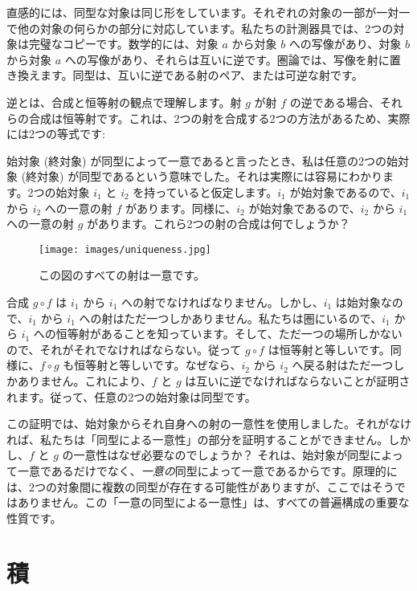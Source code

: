 直感的には、同型な対象は同じ形をしています。それぞれの対象の一部が一対一で他の対象の何らかの部分に対応しています。私たちの計測器具では、2つの対象は完璧なコピーです。数学的には、対象 $a$ から対象 $b$ への写像があり、対象 $b$ から対象 $a$ への写像があり、それらは互いに逆です。圏論では、写像を射に置き換えます。同型は、互いに逆である射のペア、または可逆な射です。

逆とは、合成と恒等射の観点で理解します。射 $g$ が射 $f$ の逆である場合、それらの合成は恒等射です。これは、2つの射を合成する2つの方法があるため、実際には2つの等式です: 

始対象 (終対象) が同型によって一意であると言ったとき、私は任意の2つの始対象 (終対象) が同型であるという意味でした。それは実際には容易にわかります。2つの始対象 $i_{1}$ と $i_{2}$ を持っていると仮定します。$i_{1}$ が始対象であるので、$i_{1}$ から $i_{2}$ への一意の射 $f$ があります。同様に、$i_{2}$ が始対象であるので、$i_{2}$ から $i_{1}$ への一意の射 $g$ があります。これら2つの射の合成は何でしょうか？

\begin{figure}[H]
  \centering
  \texttt{[image: images/uniqueness.jpg]}
  \caption{この図のすべての射は一意です。}
\end{figure}

\noindent
合成 $g \circ f$ は $i_{1}$ から $i_{1}$ への射でなければなりません。しかし、$i_{1}$ は始対象なので、$i_{1}$ から $i_{1}$ への射はただ一つしかありません。私たちは圏にいるので、$i_{1}$ から $i_{1}$ への恒等射があることを知っています。そして、ただ一つの場所しかないので、それがそれでなければならない。従って $g \circ f$ は恒等射と等しいです。同様に、$f \circ g$ も恒等射と等しいです。なぜなら、$i_{2}$ から $i_{2}$ へ戻る射はただ一つしかありません。これにより、$f$ と $g$ は互いに逆でなければならないことが証明されます。従って、任意の2つの始対象は同型です。

この証明では、始対象からそれ自身への射の一意性を使用しました。それがなければ、私たちは「同型による一意性」の部分を証明することができません。しかし、$f$ と $g$ の一意性はなぜ必要なのでしょうか？ それは、始対象が同型によって一意であるだけでなく、\emph{一意の}同型によって一意であるからです。原理的には、2つの対象間に複数の同型が存在する可能性がありますが、ここではそうではありません。この「一意の同型による一意性」は、すべての普遍構成の重要な性質です。

\section{積}

